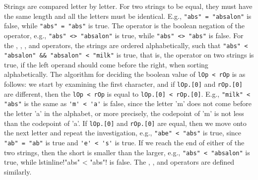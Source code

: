 Strings are compared letter by letter. For two strings to be equal, they must have the same length and all the letters must be identical. E.g., \lstinline!"abs" = "absalon"! is false, while \lstinline!"abs" = "abs"! is true. The \lexeme{<>} operator is the boolean negation of the \lexeme{=} operator, e.g., \lstinline!"abs" <> "absalon"! is true, while \lstinline!"abs" <> "abs"! is false. For the \lexeme{<} , \lexeme{<=}, \lexeme{>}, and \lexeme{>=} operators, the strings are ordered alphabetically, such that \lstinline!"abs" < "absalon" && "absalon" < "milk"! is true, that is, the \lexeme{<} operator on two strings is true, if the left operand should come before the right, when sorting alphabetically. The algorithm for deciding the boolean value of \lstinline!lOp < rOp! is as follows: we start by examining the first character, and if \lstinline!lOp.[0]! and \lstinline!rOp.[0]! are different, then the \lstinline!lOp < rOp! is equal to \lstinline!lOp.[0] < rOp.[0]!. E.g., \lstinline!"milk" < "abs"! is the same as \lstinline!'m' < 'a'! is false, since the letter 'm' does not come before the letter 'a' in the alphabet, or more precisely, the codepoint of 'm' is not less than the codepoint of 'a'. If \lstinline!lOp.[0]! and \lstinline!rOp.[0]! are equal, then we move onto the next letter and repeat the investigation, e.g., \lstinline!"abe" < "abs"! is true, since \lstinline!"ab" = "ab"! is true and \lstinline!'e' < 's'! is true. If we reach the end of either of the two strings, then the short is smaller than the larger, e.g., \lstinline!"abs" < "absalon"! is true, while lstinline!"abs" < "abs"! is false. The \lexeme{<=}, \lexeme{>}, and \lexeme{>=} operators are defined similarly.

